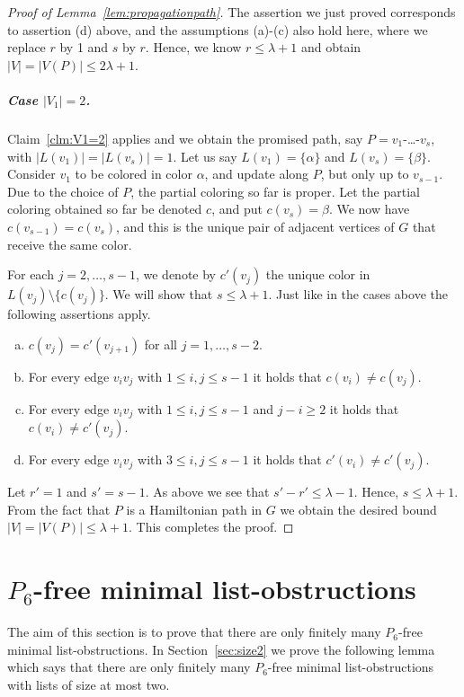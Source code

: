 \documentclass[11pt]{article}
\begin{document}
\begin{proof}[Proof of Lemma~\ref{lem:propagationpath}]
The assertion we just proved corresponds to assertion (d) above, and the assumptions (a)-(c) also hold here, where we replace $r$ by 1 and $s$ by $r$.
Hence, we know $r\le \lambda+1$ and obtain $|V| = |V(P)| \le 2 \lambda+1$.


\subparagraph{Case $|V_1|=2$.}
Claim~\ref{clm:V1=2} applies and we obtain the promised path, say $P=v_1$-\ldots-$v_s$, with $|L(v_1)|=|L(v_s)|=1$.
Let us say $L(v_1)=\{\alpha\}$ and $L(v_s)=\{\beta\}$.
Consider $v_1$ to be colored in color $\alpha$, and update along $P$, but only up to $v_{s-1}$.
Due to the choice of $P$, the partial coloring so far is proper.
Let the partial coloring obtained so far be denoted $c$, and put $c(v_s)=\beta$.
We now have $c(v_{s-1})=c(v_s)$, and this is the unique pair of adjacent vertices of $G$ that receive the same color.

For each $j=2,\ldots,s-1$, we denote by $c'(v_j)$ the unique color in $L(v_j)\setminus \{c(v_j)\}$.
We will show  that $s \leq \lambda +1$.
Just like in the cases above the following assertions apply.
\begin{enumerate}[(a)]
	\item $c(v_j)=c'(v_{j+1})$ for all $j=1,\ldots,s-2$.
	\item For every edge $v_iv_j$ with $1 \le i,j\le s-1$ it holds that $c(v_i) \neq c(v_j)$.
	\item For every edge $v_iv_j$ with $1 \le i,j\le s-1$ and $j-i \ge 2$ it holds that $c(v_i) \neq c'(v_j)$.
	\item For every edge $v_iv_j$ with $3 \le i,j\le s-1$ it holds that $c'(v_i) \neq c'(v_j)$.
\end{enumerate}
Let $r'=1$ and $s'=s-1$.
As above we see that $s'-r'\le \lambda-1$.
Hence, $s \le \lambda + 1$.
From the fact that $P$ is a Hamiltonian path in $G$ we obtain the desired bound $|V| = |V(P)| \le \lambda+1$.
This completes the proof.
\end{proof}

\section{$P_6$-free minimal list-obstructions}\label{sec:sufficiency-P6}

The aim of this section is to prove that there are only finitely many $P_6$-free minimal list-obstructions.
In Section~\ref{sec:size2} we prove the following lemma which says that there are only finitely many $P_6$-free minimal list-obstructions with lists of size at most two.
\end{document}
